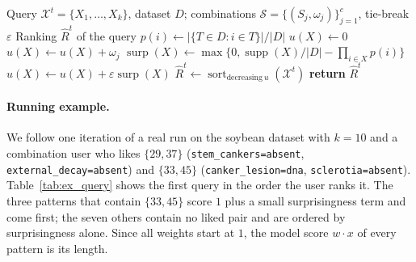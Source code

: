 \documentclass[sigconf]{acmart}
\newcommand{\surp}{\operatorname{surp}}
\newcommand{\supp}{\operatorname{supp}}
\begin{document}
\begin{algorithm}[tb]
\caption{ComboRank: ranking by the combination user}\label{alg:combo}
\footnotesize
\begin{algorithmic}[1]
\REQUIRE Query $\mathcal X^t=\{X_1,\ldots,X_k\}$, dataset $D$; combinations $\mathcal S=\{(S_j,\omega_j)\}_{j=1}^{c}$, tie-break $\varepsilon$
\ENSURE Ranking $\hat R^t$ of the query
 \STATE $p(i)\gets |\{T\in D:i\in T\}|/|D|$
\ENDFOR
{}
  \STATE $u(X)\gets0$
     \STATE $u(X)\gets u(X)+\omega_j$ \ENDIF
  \ENDFOR
  \STATE $\surp(X)\gets\max\{0,\supp(X)/|D|-\prod_{i\in X}p(i)\}$
  \STATE $u(X)\gets u(X)+\varepsilon\surp(X)$
\ENDFOR
\STATE $\hat R^t\gets\operatorname{sort}_{\mathrm{decreasing}\ u}(\mathcal X^t)$
\STATE \textbf{return} $\hat R^t$
\end{algorithmic}
\end{algorithm}

\paragraph{Running example.}
We follow one iteration of a real run on the soybean dataset with $k=10$ and a combination user who likes $\{29,37\}$ (\texttt{stem\_cankers=absent}, \texttt{external\_decay=absent}) and $\{33,45\}$ (\texttt{canker\_lesion=dna}, \texttt{sclerotia=absent}). Table~\ref{tab:ex_query} shows the first query in the order the user ranks it. The three patterns that contain $\{33,45\}$ score $1$ plus a small surprisingness term and come first; the seven others contain no liked pair and are ordered by surprisingness alone. Since all weights start at $1$, the model score $w\cdot x$ of every pattern is its length.
\end{document}

